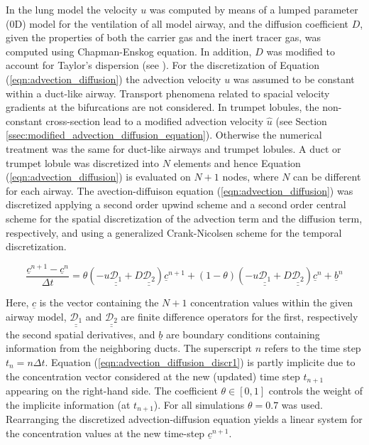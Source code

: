 In the lung model the velocity $u$ was computed by means of a lumped parameter (0D) model for the ventilation of all model airway, and the diffusion coefficient $D$, given the properties of both the carrier gas and the inert tracer gas, was computed using Chapman-Enskog equation.
In addition, $D$ was modified to account for Taylor's dispersion (see \cite{Cussler2009}).
For the discretization of Equation (\ref{eqn:advection_diffusion}) the advection velocity $u$ was assumed to be constant within a duct-like airway.
Transport phenomena related to spacial velocity gradients at the bifurcations are not considered.
In trumpet lobules, the non-constant cross-section lead to a modified advection velocity $\hat{u}$ (see Section \ref{ssec:modified_advection_diffusion_equation}).
Otherwise the numerical treatment was the same for duct-like airways and trumpet lobules.
A duct or trumpet lobule was discretized into $N$ elements and hence Equation (\ref{eqn:advection_diffusion}) is evaluated on $N+1$ nodes, where $N$ can be different for each airway.
The avection-diffuison equation (\ref{eqn:advection_diffusion}) was discretized applying a second order upwind scheme and a second order central scheme for the spatial discretization of the advection term and the diffusion term, respectively, and using a generalized Crank-Nicolsen scheme for the temporal discretization.

\begin{equation} \label{eqn:advection_diffusion_discr1}
\frac{\underline{c}^{n+1} - \underline{c}^{n}}{\Delta t} = \theta(-u\underline{\underline{\mathcal{D}_1}} + D \underline{\underline{\mathcal{D}_2}})\underline{c}^{n+1} + (1 - \theta)(-u\underline{\underline{\mathcal{D}_1}} + D \underline{\underline{\mathcal{D}_2}})\underline{c}^{n} + \underline{b}^n
\end{equation}

Here, $\underline{c}$ is the vector containing the $N+1$ concentration values within the given airway model, $\underline{\underline{\mathcal{D}_1}}$ and $\underline{\underline{\mathcal{D}_2}}$ are finite difference operators for the first, respectively the second spatial derivatives, and $\underline{b}$ are boundary conditions containing information from the neighboring ducts.
The superscript $n$ refers to the time step $t_n = n \Delta t$.
Equation (\ref{eqn:advection_diffusion_discr1}) is partly implicite due to the concentration vector considered at the new (updated) time step  $t_{n+1}$ appearing on the right-hand side.
The coefficient $\theta \in [0, 1]$ controls the weight of the implicite information (at $t_{n+1}$).
For all simulations $\theta = 0.7$ was used.
Rearranging the discretized advection-diffusion equation yields a linear system for the concentration values at the new time-step $\underline{c}^{n+1}$.

